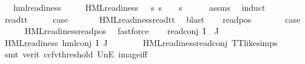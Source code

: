 \begin{isabellebody}
\ \ \ {\isachardoublequoteopen}hml{\isacharunderscore}{\kern0pt}readiness\ {\isasymphi}{\isachardoublequoteclose}\isanewline
\ \ \ {\isachardoublequoteopen}{\isasymexists}{\isasympsi}{\isachardot}{\kern0pt}\ HML{\isacharunderscore}{\kern0pt}readiness\ {\isasympsi}\ {\isasymand}\ {\isacharparenleft}{\kern0pt}{\isasymforall}s{\isachardot}{\kern0pt}\ {\isacharparenleft}{\kern0pt}s\ {\isasymTurnstile}\ {\isasymphi}{\isacharparenright}{\kern0pt}\ {\isasymlongleftrightarrow}\ {\isacharparenleft}{\kern0pt}s\ {\isasymTurnstile}\ {\isasympsi}{\isacharparenright}{\kern0pt}{\isacharparenright}{\kern0pt}{\isachardoublequoteclose}\isanewline
%
\isadelimproof
\ \ %
\endisadelimproof
%
\isatagproof
{}\isamarkupfalse%
\ assms\ \isamarkupfalse%
\ induct\isanewline
\ \ \isamarkupfalse%
\ read{\isacharunderscore}{\kern0pt}tt\isanewline
\ \ \isamarkupfalse%
\ \isamarkupfalse%
\ {\isacharquery}{\kern0pt}case\ \isanewline
\ \ \ \ \isamarkupfalse%
\ HML{\isacharunderscore}{\kern0pt}readiness{\isachardot}{\kern0pt}read{\isacharunderscore}{\kern0pt}tt\ \isamarkupfalse%
\ blast\isanewline
{}\isamarkupfalse%
\isanewline
\ \ \isamarkupfalse%
\ {\isacharparenleft}{\kern0pt}read{\isacharunderscore}{\kern0pt}pos\ {\isasymphi}\ {\isasymalpha}{\isacharparenright}{\kern0pt}\isanewline
\ \ \isamarkupfalse%
\ \isamarkupfalse%
\ {\isacharquery}{\kern0pt}case\ \isanewline
\ \ \ \ \isamarkupfalse%
\ HML{\isacharunderscore}{\kern0pt}readiness{\isachardot}{\kern0pt}read{\isacharunderscore}{\kern0pt}pos\ \isamarkupfalse%
\ fastforce\isanewline
{}\isamarkupfalse%
\isanewline
\ \ \isamarkupfalse%
\ {\isacharparenleft}{\kern0pt}read{\isacharunderscore}{\kern0pt}conj\ I\ {\isasymPhi}\ J{\isacharparenright}{\kern0pt}\isanewline
\ \ \isamarkupfalse%
\ {\isachardoublequoteopen}HML{\isacharunderscore}{\kern0pt}readiness\ {\isacharparenleft}{\kern0pt}hml{\isacharunderscore}{\kern0pt}conj\ I\ J\ {\isasymPhi}{\isacharparenright}{\kern0pt}{\isachardoublequoteclose}\ \isanewline
\ \ \ \ \isamarkupfalse%
\ HML{\isacharunderscore}{\kern0pt}readiness{\isachardot}{\kern0pt}read{\isacharunderscore}{\kern0pt}conj\ TT{\isacharunderscore}{\kern0pt}like{\isachardot}{\kern0pt}simps\ \isanewline
\ \ \ \ \isamarkupfalse%
\ {\isacharparenleft}{\kern0pt}smt\ {\isacharparenleft}{\kern0pt}verit{\isacharcomma}{\kern0pt}\ ccfv{\isacharunderscore}{\kern0pt}threshold{\isacharparenright}{\kern0pt}\ UnE\ image{\isacharunderscore}{\kern0pt}iff{\isacharparenright}{\kern0pt}\isanewline

\end{isabellebody}
